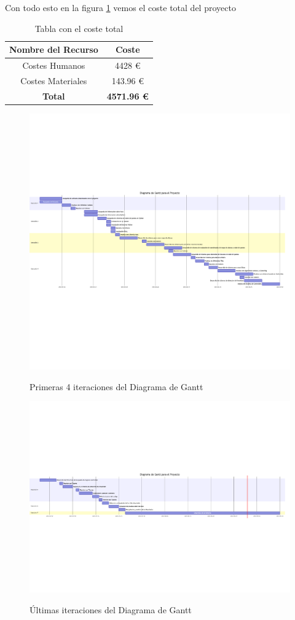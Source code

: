 Con todo esto en la figura \ref{tabcostot} vemos el coste total del proyecto

\begin{table}[hp!]
   \centering
  \begin{tabular}{c|c}
  \rowcolor{udcpink!25}
  \textbf{Nombre del Recurso} & \textbf{Coste} \\\hline
  
  Costes Humanos & 4428 € \\
  Costes Materiales & 143.96 €  \\
  \textbf{Total}  &  \textbf{4571.96 €} \\
  \end{tabular}

  \caption{Tabla con el coste total}
  \label{tabcostot}
\end{table}


\begin{figure}[h]
\centering
\includegraphics[width=15cm]{imaxes/gantt1.png}
\label{fig:pointnetc}
\caption{Primeras 4 iteraciones del Diagrama de Gantt}
\end{figure}

\begin{figure}[h]
\centering
\includegraphics[width=15cm]{imaxes/gantt2.png}
\label{fig:pointnetc}
\caption{Últimas iteraciones del Diagrama de Gantt}
\end{figure}


